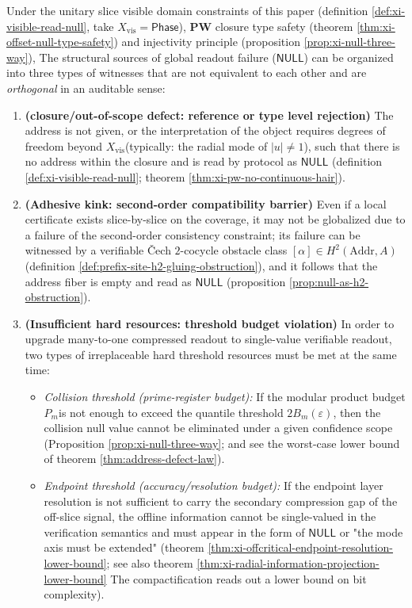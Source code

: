 \begin{theorem}\label{thm:xi-null-orthogonal-trichotomy-resource-nonsubstitutable}
Under the unitary slice visible domain constraints of this paper (definition \ref{def:xi-visible-read-null}, take \(X_{\mathrm{vis}}=\mathsf{Phase}\)), \(\mathbf{PW}\) closure type safety (theorem \ref{thm:xi-offset-null-type-safety}) and injectivity principle (proposition \ref{prop:xi-null-three-way}),
The structural sources of global readout failure (\(\mathsf{NULL}\)) can be organized into three types of witnesses that are not equivalent to each other and are \emph{orthogonal} in an auditable sense:
\begin{enumerate}
  \item ​​\textbf{(closure/out-of-scope defect: reference or type level rejection)}
  The address is not given, or the interpretation of the object requires degrees of freedom beyond \(X_{\mathrm{vis}}\) ​​(typically: the radial mode of \(|u|\neq 1\)), such that there is no address within the closure and is read by protocol as \(\mathsf{NULL}\) (definition \ref{def:xi-visible-read-null}; theorem \ref{thm:xi-pw-no-continuous-hair}).
  \item ​​\textbf{(Adhesive kink: second-order compatibility barrier)}
  Even if a local certificate exists slice-by-slice on the coverage, it may not be globalized due to a failure of the second-order consistency constraint; its failure can be witnessed by a verifiable Čech \(2\)-cocycle obstacle class \([\alpha]\in H^2(\mathrm{Addr},A)\) (definition \ref{def:prefix-site-h2-gluing-obstruction}), and it follows that the address fiber is empty and read as \(\mathsf{NULL}\) (proposition \ref{prop:null-as-h2-obstruction}).
  \item ​​\textbf{(Insufficient hard resources: threshold budget violation)}
  In order to upgrade many-to-one compressed readout to single-value verifiable readout, two types of irreplaceable hard threshold resources must be met at the same time:
  \begin{itemize}
    \item \emph{Collision threshold (prime-register budget):} If the modular product budget \(P_m\) ​​is not enough to exceed the quantile threshold \(2B_m(\varepsilon)\), then the collision null value cannot be eliminated under a given confidence scope (Proposition \ref{prop:xi-null-three-way}; and see the worst-case lower bound of theorem \ref{thm:address-defect-law}).  
    \item \emph{Endpoint threshold (accuracy/resolution budget):} If the endpoint layer resolution is not sufficient to carry the secondary compression gap of the off-slice signal, the offline information cannot be single-valued in the verification semantics and must appear in the form of \(\mathsf{NULL}\) or "the mode axis must be extended" (theorem \ref{thm:xi-offcritical-endpoint-resolution-lower-bound}; see also theorem \ref{thm:xi-radial-information-projection-lower-bound} The compactification reads out a lower bound on bit complexity).

\end{itemize}
\end{enumerate}
\end{theorem}
